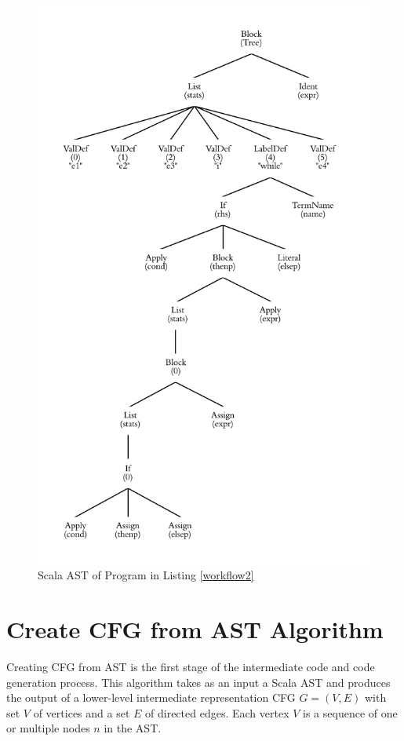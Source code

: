 \begin{figure}[h!]
\centering
\includegraphics[width=0.8\linewidth]{figures/Tree}
\caption{Scala AST of Program in Listing \ref{workflow2}}
\label{fig:Tree}
\end{figure}

\section{Create CFG from AST Algorithm}
Creating CFG from AST is the first stage of the intermediate code and code generation process. This algorithm takes as an input a Scala AST and produces the output of a lower-level intermediate representation CFG $G=(V,E)$ with set $V$ of vertices and a set $E$ of directed edges. Each vertex $V$ is a sequence of one or multiple nodes $n$ in the AST. 

